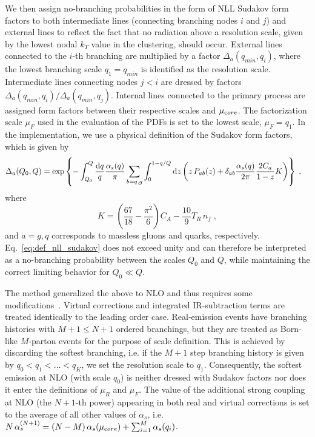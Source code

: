 We then assign no-branching probabilities in the form of NLL
Sudakov form factors to both intermediate lines (connecting branching nodes $i$ and $j$) and external
lines to reflect the fact that no radiation above a resolution scale, given
by the lowest nodal
$k_T$ value in the clustering, should occur. External lines connected to the $i$-th branching are multiplied by a
factor $\Delta_a (q_{min},q_i)$, where the lowest branching scale $q_1=q_{min}$ is
identified as the resolution scale. Intermediate lines connecting nodes $j<i$
are dressed by factors $\Delta_a (q_{min},q_i)/ \Delta_a (q_{min},q_j)$.
Internal lines connected to the primary process are assigned form factors
between their respective scales and $\mu_{\textrm core}$. The factorization scale
$\mu_F$ used in the evaluation of the PDFs is set to the lowest scale, $\mu_F=q_1$. In the \MINLOp{} implementation, we use a physical definition of the Sudakov form factors, which is given by
\begin{equation}\label{eq:def_nll_sudakov}
  \begin{split}
    &\Delta_a(Q_0,Q)=\exp\left\{-\int_{Q_0}^Q\frac{{\textrm d} q}{q}
    \frac{\alpha_s(q)}{\pi}\sum_{b=q,g}\int_0^{1-q/Q}{\textrm d}z
    \left(z\,P_{ab}(z)+\delta_{ab}\frac{\alpha_s(q)}{2\pi}\frac{2C_a}{1-z}K\right)\right\}\;,
  \end{split}
\end{equation}
where~\cite{Catani:1990rr}
\begin{equation}
  K=\left(\frac{67}{18}-\frac{\pi^2}{6}\right)C_A-\frac{10}{9}T_R\,n_f\;,
\end{equation}
and $a=g,q$ corresponds to massless gluons and quarks, respectively.
Eq.~\eqref{eq:def_nll_sudakov} does not exceed unity and can therefore
be interpreted as a no-branching probability between the scales
$Q_0$ and $Q$, while maintaining the correct limiting behavior for $Q_0\ll Q$.

The \MINLO{} method generalized the above to NLO and thus requires some modifications~\cite{MINLO}. Virtual corrections and integrated IR-subtraction terms are treated identically
to the leading order case. Real-emission events have branching histories with
$M+1 \leq N+1$ ordered branchings, but they are treated as Born-like $M$-parton events
for the purpose of scale definition. This is achieved by discarding the softest branching,
i.e. if the $M+1$ step branching history is given by $q_0<q_1<\dots<q_K$, we set the
resolution scale to $q_1$. Consequently, the softest emission at NLO (with scale $q_0$)
is neither dressed with Sudakov factors nor does it enter the definitions of $\mu_R$
and $\mu_F$. The value of the additional strong coupling at NLO (the $N+1$-th power)
appearing in both real and virtual corrections is set to the average of all other values
of $\alpha_s$, i.e.\ $N\,\alpha_s^{(N+1)}=(N-M)\,\alpha_s(\mu_{\textrm core})+\sum_{i=1}^M\alpha_s(q_i)$.


